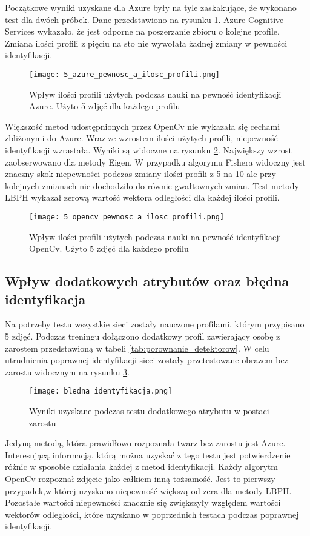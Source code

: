 Początkowe wyniki uzyskane dla Azure były na tyle zaskakujące, że wykonano test dla dwóch próbek. Dane przedstawiono na rysunku \ref{fig:azure_5__profile}. Azure Cognitive Services wykazało, że jest odporne na poszerzanie zbioru o kolejne profile. Zmiana ilości profili z pięciu na sto nie wywołała żadnej zmiany w pewności identyfikacji.
\begin{figure}[H]
	\centering
	\texttt{[image: 5\_azure\_pewnosc\_a\_ilosc\_profili.png]}
	\caption{Wpływ ilości profili użytych podczas nauki na pewność identyfikacji Azure. Użyto 5 zdjęć dla każdego profilu}
	\label{fig:azure_5__profile}
\end{figure}
Większość metod udostępnionych przez OpenCv nie wykazała się cechami zbliżonymi do Azure. Wraz ze wzrostem ilości użytych profili, niepewność identyfikacji wzrastała. Wyniki są widoczne na rysunku \ref{fig:opencv_5__profile}. Największy wzrost zaobserwowano dla metody Eigen. W przypadku algorymu Fishera widoczny jest znaczny skok niepewności podczas zmiany ilości profili z 5 na 10 ale przy kolejnych zmianach nie dochodziło do równie gwałtownych zmian. Test metody LBPH wykazał zerową wartość wektora odległości dla każdej ilości profili.
\begin{figure}[H]
	\centering
	\texttt{[image: 5\_opencv\_pewnosc\_a\_ilosc\_profili.png]}
	\caption{Wpływ ilości profili użytych podczas nauki na pewność identyfikacji OpenCv. Użyto 5 zdjęć dla każdego profilu}
	\label{fig:opencv_5__profile}
\end{figure}

\subsection{Wpływ dodatkowych atrybutów oraz błędna identyfikacja}
Na potrzeby testu wszystkie sieci zostały nauczone profilami, którym przypisano 5 zdjęć. Podczas treningu dołączono dodatkowy profil zawierający osobę z zarostem przedstawioną w tabeli \ref{tab:porownanie_detektorow}. W celu utrudnienia poprawnej identyfikacji sieci zostały przetestowane obrazem bez zarostu widocznym na rysunku \ref{fig:bledna_identyfikacja}.
\begin{figure}[H]
	\centering
	\texttt{[image: bledna\_identyfikacja.png]}
	\caption{Wyniki uzyskane podczas testu dodatkowego atrybutu w postaci zarostu}
	\label{fig:bledna_identyfikacja}
\end{figure}
Jedyną metodą, która prawidłowo rozpoznała twarz bez zarostu jest Azure. Interesującą informacją, którą można uzyskać z tego testu jest potwierdzenie różnic w sposobie działania każdej z metod identyfikacji. Każdy algorytm OpenCv rozpoznał zdjęcie jako całkiem inną tożsamość. Jest to pierwszy przypadek,w której uzyskano niepewność większą od zera dla metody LBPH. Pozostałe wartości niepewności znacznie się zwiększyły względem wartości wektorów odległości, które uzyskano w poprzednich testach podczas poprawnej identyfikacji.

